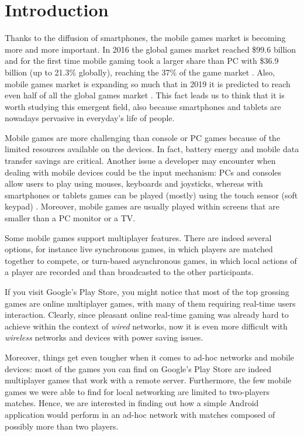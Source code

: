 \section{Introduction}
Thanks to the diffusion of smartphones, the mobile games market is becoming
more and more important. In 2016 the global games market reached \$99.6
billion and for the first time mobile gaming took a larger share than PC
with \$36.9 billion (up to 21.3\% globally), reaching the 37\% of the game
market \cite{bib:newzoo2}. Also, mobile games market is expanding so much that
in 2019 it is predicted to reach even half of all the global games market
\cite{bib:newzoo}. This fact leads us to think that it is worth studying
this emergent field, also because smartphones and tablets are nowadays
pervasive in everyday's life of people.

Mobile games are more challenging than console or PC games because of the
limited resources available on the devices. In fact, battery energy and
mobile data transfer savings are critical. Another issue a developer may
encounter when dealing with mobile devices could be the input mechanism:
PCs and consoles allow users to play using mouses, keyboards and joysticks,
whereas with smartphones or tablets games can be played (mostly) using the
touch sensor (soft keypad) \cite{bib:mobile-input-devices}. Moreover, mobile
games are usually played within screens that are smaller than a PC monitor or a
TV.

Some mobile games support multiplayer features. There are indeed several
options, for instance live synchronous games, in which players are matched
together to compete, or turn-based asynchronous games, in which local actions
of a player are recorded and than broadcasted to the other participants.

If you visit Google's Play Store, you might notice that most of the top
grossing games are online multiplayer games, with many of them requiring
real-time users interaction. Clearly, since pleasant online real-time gaming
was already hard to achieve within the context of \textit{wired} networks, now
it is even more difficult with \textit{wireless} networks and devices with
power saving issues.

Moreover, things get even tougher when it comes to ad-hoc networks and mobile
devices: most of the games you can find on Google's Play Store are indeed
multiplayer games that work with a remote server. Furthermore, the few mobile
games we were able to find for local networking are limited to two-players
matches. Hence, we are interested in finding out how a simple Android
application would perform in an ad-hoc network with matches composed of
possibly more than two players.

